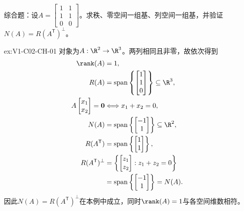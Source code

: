 \begin{SLChapterExercisePairSection}
\begin{exercise}[章末综合]\label{ex:V1-C02-CH-01}
综合题：设$A=\begin{bmatrix}1&1\\1&1\\0&0\end{bmatrix}$。求秩、零空间一组基、列空间一组基，并验证$N(A)=R(A^{\mathsf T})^{\perp}$。
\end{exercise}
\label{sol:V1-C02-CH-01}
\begin{chapterexercisesolution}{ex:V1-C02-CH-01}
对象为$A:\R^2\to\R^3$。两列相同且非零，故依次得到
\[
\begin{aligned}
\rank(A)&=1,\\
R(A)&=\operatorname{span}\left\{\begin{bmatrix}1\\1\\0\end{bmatrix}\right\}\subseteq\R^3,\\
A\begin{bmatrix}x_1\\x_2\end{bmatrix}=\boldsymbol0
&\Longleftrightarrow x_1+x_2=0,\\
N(A)&=\operatorname{span}\left\{\begin{bmatrix}-1\\1\end{bmatrix}\right\}\subseteq\R^2,\\
R(A^{\mathsf T})
&=\operatorname{span}\left\{\begin{bmatrix}1\\1\end{bmatrix}\right\},\\
R(A^{\mathsf T})^\perp
&=\left\{\begin{bmatrix}z_1\\z_2\end{bmatrix}:z_1+z_2=0\right\}\\
&=\operatorname{span}\left\{\begin{bmatrix}-1\\1\end{bmatrix}\right\}=N(A).
\end{aligned}
\]
因此$N(A)=R(A^{\mathsf T})^\perp$在本例中成立，同时$\rank(A)=1$与各空间维数相符。
\end{chapterexercisesolution}

\end{SLChapterExercisePairSection}

